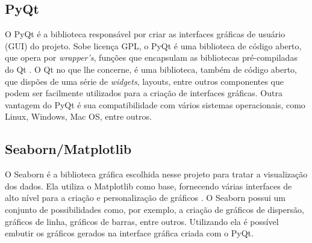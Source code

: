     \subsection{PyQt}

    O PyQt é a biblioteca responsável por criar as interfaces gráficas de usuário (GUI) do projeto. Sobe licença GPL, o PyQt é uma biblioteca de código aberto, que opera por \textit{wrapper's}, funções que encapsulam as bibliotecas pré-compiladas do Qt \cite{pyqt}. O Qt no que lhe concerne, é uma biblioteca, também de código aberto, que dispões de uma série de \textit{widgets}, layouts, entre outros componentes que podem ser facilmente utilizados para a criação de interfaces gráficas. Outra vantagem do PyQt é sua compatibilidade com vários sistemas operacionais, como Linux, Windows, Mac OS, entre outros.

    \subsection{Seaborn/Matplotlib}

    O Seaborn é a biblioteca gráfica escolhida nesse projeto para tratar a visualização dos dados. Ela utiliza o Matplotlib como base, fornecendo várias interfaces de alto nível para a criação e personalização de gráficos \cite{seaborn}. O Seaborn possui um conjunto de possibilidades como, por exemplo, a criação de gráficos de dispersão, gráficos de linha, gráficos de barras, entre outros. Utilizando ela é possível embutir os gráficos gerados na interface gráfica criada com o PyQt.

    

